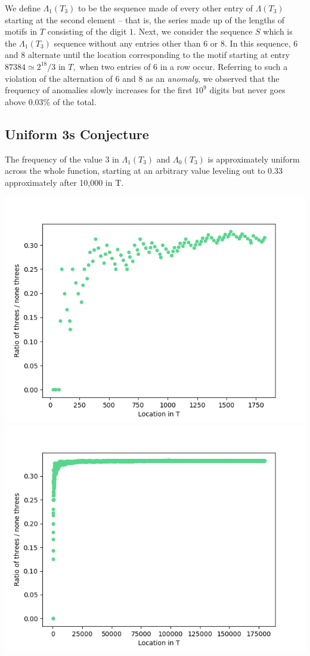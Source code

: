 \documentclass{article}
\begin{document}
We define $\Lambda_1(T_3)$ to be the sequence made of every other entry of $\Lambda(T_3)$ starting at the second element -- that is, the series made up of the lengths of motifs in $T$ consisting of the digit $1.$ Next, we consider the sequence $S$ which is the $\Lambda_1(T_3)$ sequence without any entries other than $6$ or $8.$ In this sequence, $6$ and $8$ alternate until the location corresponding to the motif starting at entry $87384 \simeq 2^{18}/3$ in $T,$ when two entries of $6$ in a row occur. Referring to such a violation of the alternation of $6$ and $8$ as an \emph{anomaly}, we observed that the frequency of anomalies slowly increases for the first $10^9$ digits but never goes above $0.03\%$ of the total.

\subsection{Uniform 3s Conjecture}
The frequency of the value 3 in $\Lambda{_1(T_3)}$ and $\Lambda{_0(T_3)}$ is approximately uniform across the whole function, starting at an arbitrary value leveling out to 0.33 approximately after 10,000 in T.

\includegraphics[scale=0.4]{lambda_ratio_from_data1_ones_100}
\includegraphics[scale=0.4]{lambda_ratio_from_data1_ones_10000}
\end{document}
